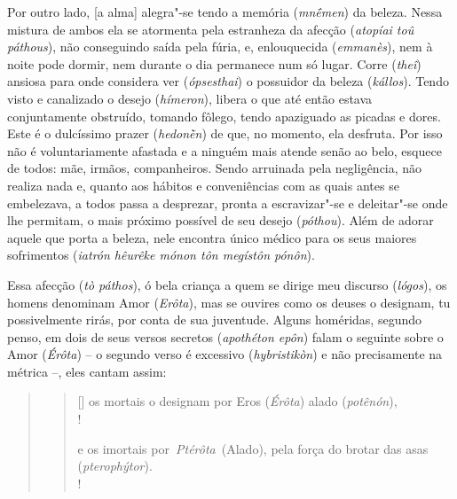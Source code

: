 Por outro lado, [a alma] alegra"-se tendo a memória (\emph{mnḗmen})
da beleza. Nessa mistura de ambos ela se atormenta pela estranheza da
afecção (\emph{atopíai toû páthous}), não conseguindo saída pela fúria,
e, enlouquecida (\emph{emmanès}), nem à noite pode dormir, nem durante o
dia permanece num só lugar. \bekker{[251e]} Corre (\emph{theî}) ansiosa para
onde considera ver (\emph{ópsesthai}) o possuidor da beleza
(\emph{kállos}). Tendo visto e canalizado o desejo (\emph{hímeron}),
libera o que até então estava conjuntamente obstruído, tomando fôlego,
tendo apaziguado as picadas e dores. Este é o dulcíssimo prazer
(\emph{hedonḕn}) de que, no momento, ela desfruta. Por isso não é
voluntariamente afastada e a ninguém mais atende senão ao belo,
\bekker{[252a]} esquece de todos: mãe, irmãos, companheiros. Sendo arruinada
pela negligência, não realiza nada e, quanto aos hábitos e conveniências
com as quais antes se embelezava, a todos passa a desprezar, pronta a
escravizar"-se e deleitar"-se onde lhe permitam, o mais próximo possível
de seu desejo (\emph{póthou}). Além de adorar aquele que porta a beleza,
nele encontra único médico para os seus maiores sofrimentos
(\emph{iatrón hêurêke mónon tôn megístôn pónôn}).

\bekker{[252b]} Essa afecção (\emph{tò páthos}), ó bela criança a quem se
dirige meu discurso (\emph{lógos}), os homens denominam Amor
(\emph{Erôta}), mas se ouvires como os deuses o designam, tu
possivelmente rirás, por conta de sua juventude. Alguns homéridas,
segundo penso, em dois de seus versos secretos (\emph{apothéton epôn})
falam o seguinte sobre o Amor (\emph{Érôta}) -- o segundo verso é
excessivo (\emph{hybristikòn}) e não precisamente na métrica --, eles
cantam assim:

\begin{quote}
 


\begin{verse}[\versewidth]
os mortais o designam por Eros (\emph{Érôta}) alado (\emph{potênón}),\\!

e os imortais por\emph{~Ptérôta}~(Alado), pela força do brotar das asas
(\emph{pterophýtor}).\\!
\end{verse} 
\end{quote}

